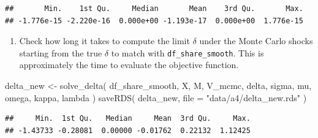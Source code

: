 \documentclass[
]{book}
\newenvironment{Shaded}{\begin{snugshade}}{\end{snugshade}}
\newcommand{\AttributeTok}[1]{\textcolor[rgb]{0.77,0.63,0.00}{#1}}
\newcommand{\FunctionTok}[1]{\textcolor[rgb]{0.00,0.00,0.00}{#1}}
\newcommand{\NormalTok}[1]{#1}
\newcommand{\OtherTok}[1]{\textcolor[rgb]{0.56,0.35,0.01}{#1}}
\newcommand{\SpecialCharTok}[1]{\textcolor[rgb]{0.00,0.00,0.00}{#1}}
\newcommand{\StringTok}[1]{\textcolor[rgb]{0.31,0.60,0.02}{#1}}
\providecommand{\tightlist}{%
  \setlength{\itemsep}{0pt}\setlength{\parskip}{0pt}}
\begin{document}
\begin{verbatim}
##       Min.    1st Qu.     Median       Mean    3rd Qu.       Max. 
## -1.776e-15 -2.220e-16  0.000e+00 -1.193e-17  0.000e+00  1.776e-15
\end{verbatim}

\begin{enumerate}
\def\labelenumi{\arabic{enumi}.}
\setcounter{enumi}{8}
\tightlist
\item
  Check how long it takes to compute the limit \(\delta\) under the Monte Carlo shocks starting from the true \(\delta\) to match with \texttt{df\_share\_smooth}. This is approximately the time to evaluate the objective function.
\end{enumerate}

\begin{Shaded}
\begin{Highlighting}[]
\NormalTok{delta\_new }\OtherTok{\textless{}{-}}
  \FunctionTok{solve\_delta}\NormalTok{(}
\NormalTok{    df\_share\_smooth, }
\NormalTok{    X, }
\NormalTok{    M, }
\NormalTok{    V\_mcmc, }
\NormalTok{    delta, }
\NormalTok{    sigma, }
\NormalTok{    mu, }
\NormalTok{    omega, }
\NormalTok{    kappa, }
\NormalTok{    lambda}
\NormalTok{    )}
\FunctionTok{saveRDS}\NormalTok{(}
\NormalTok{  delta\_new, }
  \AttributeTok{file =} \StringTok{"data/a4/delta\_new.rds"}
\NormalTok{  )}
\end{Highlighting}
\end{Shaded}

\begin{Shaded}
\end{Shaded}

\begin{verbatim}
##     Min.  1st Qu.   Median     Mean  3rd Qu.     Max. 
## -1.43733 -0.28081  0.00000 -0.01762  0.22132  1.12425
\end{verbatim}
\end{document}
